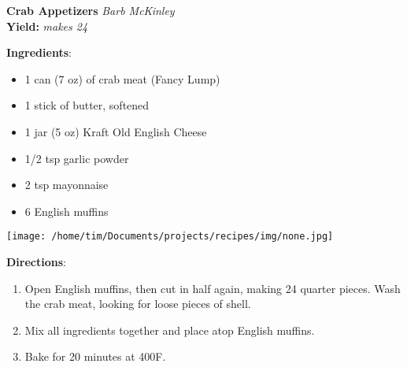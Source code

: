 \documentclass[11pt, twoside, openany]{book}
\begin{document}
\noindent\begin{minipage}[t]{\linewidth}%
{\Large\textbf{Crab Appetizers}} \label{crab-appetizers}\hfill\textit{Barb McKinley}\\
\textbf{Yield:} \textit{makes 24}\\
\noindent\begin{minipage}[t]{0.78\linewidth}%
\textbf{Ingredients}:\vspace{-3mm}
\begin{multicols}{2}
\begin{itemize}\setlength\itemsep{-1mm}
\item 1 can (7 oz) of crab meat (Fancy Lump)
\item 1 stick of butter, softened
\item 1 jar (5 oz) Kraft Old English Cheese
\item 1/2 tsp garlic powder
\item 2 tsp mayonnaise
\item 6 English muffins
\end{itemize}
\end{multicols}
\end{minipage}
\noindent\begin{minipage}[t]{0.18\linewidth}
\centering \strut\vspace*{-\baselineskip}\newline
\texttt{[image: /home/tim/Documents/projects/recipes/img/none.jpg]}\\
\end{minipage}\vspace{3mm}
\textbf{Directions}:
\vspace{-3mm}\begin{enumerate}\setlength\itemsep{-1mm}
\item Open English muffins, then cut in half again, making 24 quarter pieces. Wash the crab meat, looking for loose pieces of shell.
\item Mix all ingredients together and place atop English muffins.
\item Bake for 20 minutes at 400F.
\end{enumerate}
\end{minipage}\vspace{8mm}
\end{document}
